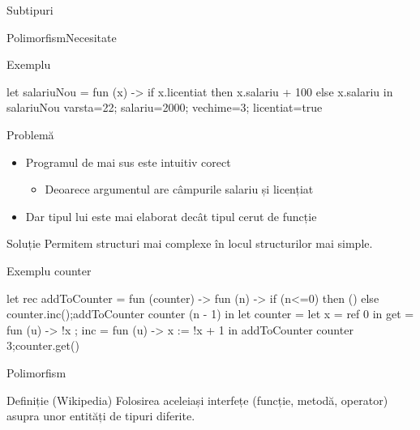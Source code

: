 \documentclass[xcolor=pdftex,romanian,colorlinks]{beamer}
\begin{document}
\begin{section}{Subtipuri}
\begin{frame}[fragile]{Polimorfism}{Necesitate}
\begin{block}{Exemplu}
\begin{asciiml}
let salariuNou = fun (x) 
   -> if x.licentiat then x.salariu + 100
                     else x.salariu
in salariuNou {varsta=22; salariu=2000; vechime=3; licentiat=true }
\end{asciiml}
\end{block}
\begin{alertblock}{Problemă}
\begin{itemize}
\item Programul de mai sus este intuitiv corect
\begin{itemize}\item Deoarece argumentul are câmpurile salariu și licențiat
\end{itemize}
\item Dar tipul lui este mai elaborat decât tipul cerut de funcție
\end{itemize}
\end{alertblock}

\begin{block}{Soluție}
Permitem structuri mai complexe în locul structurilor mai simple.
\end{block}
\end{frame}

\begin{frame}[fragile]{Exemplu counter}
\begin{asciiml}
let rec addToCounter = fun (counter) -> fun (n) ->
  if (n<=0) then () else counter.inc();addToCounter counter (n - 1)
in let counter = let x = ref 0 in {
  get = fun (u) -> !x ;
  inc = fun (u) -> x := !x + 1 
} 
in addToCounter counter 3;counter.get()
\end{asciiml}
\end{frame}

\begin{frame}{Polimorfism}
\begin{block}{Definiție (Wikipedia)}
Folosirea aceleiași interfețe (funcție, metodă, operator) asupra unor entități de tipuri diferite.
\end{block}


\end{frame}
\end{section}
\end{document}

